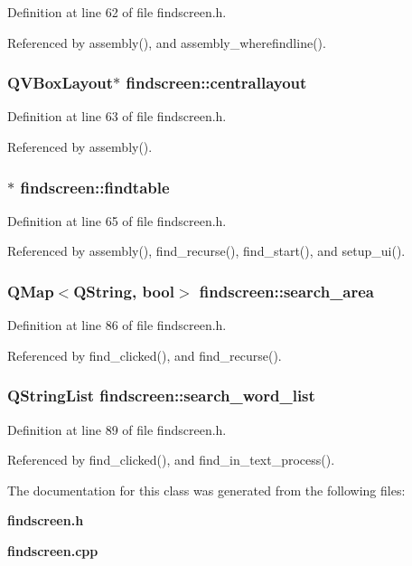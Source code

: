 Definition at line 62 of file findscreen.h.

Referenced by assembly(), and assembly\_\-wherefindline().
\subsubsection{\setlength{\rightskip}{0pt plus 5cm}QVBox\-Layout$\ast$ {\bf findscreen::centrallayout}\hspace{0.3cm}{\tt  [private]}}\label{classfindscreen_6f77f9b004aa58ea1555cade0ea5bbcd}




Definition at line 63 of file findscreen.h.

Referenced by assembly().
\subsubsection{$\ast$ {\bf findscreen::findtable}\hspace{0.3cm}{\tt  [private]}}\label{classfindscreen_b51326b828689313939e3aca6a224f10}




Definition at line 65 of file findscreen.h.

Referenced by assembly(), find\_\-recurse(), find\_\-start(), and setup\_\-ui().
\subsubsection{\setlength{\rightskip}{0pt plus 5cm}QMap$<$QString, bool$>$ {\bf findscreen::search\_\-area}\hspace{0.3cm}{\tt  [private]}}\label{classfindscreen_f79593d8e31d6434bcc842cec63e48b3}




Definition at line 86 of file findscreen.h.

Referenced by find\_\-clicked(), and find\_\-recurse().
\subsubsection{\setlength{\rightskip}{0pt plus 5cm}QString\-List {\bf findscreen::search\_\-word\_\-list}\hspace{0.3cm}{\tt  [private]}}\label{classfindscreen_48e985c7f0fafaa386a5708c45395a75}




Definition at line 89 of file findscreen.h.

Referenced by find\_\-clicked(), and find\_\-in\_\-text\_\-process().

The documentation for this class was generated from the following files:\begin{CompactItemize}
\item 
{\bf findscreen.h}\item 
{\bf findscreen.cpp}\end{CompactItemize}
